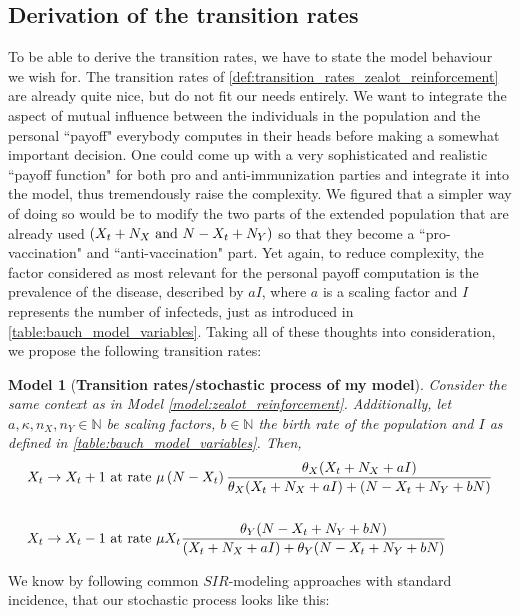 \documentclass[12pt,a4paper,twoside]{article}
\newtheorem{model}{Model}[section]
\begin{document}
\subsection{Derivation of the transition rates}
To be able to derive the transition rates, we have to state the model behaviour we wish for. The transition rates of \eqref{def:transition_rates_zealot_reinforcement} are already quite nice, but do not fit our needs entirely. We want to integrate the aspect of mutual influence between the individuals in the population and the personal ``payoff" everybody computes in their heads before making a somewhat important decision. One could come up with a very sophisticated and realistic ``payoff function" for both pro and anti-immunization parties and integrate it into the model, thus tremendously raise the complexity. We figured that a simpler way of doing so would be to modify the two parts of the extended population that are already used $\left(X_t + N_X\textnormal{ and }N- X_t + N_Y\right)$ so that they become a ``pro-vaccination" and ``anti-vaccination" part. Yet again, to reduce complexity, the factor considered as most relevant for the personal payoff computation is the prevalence of the disease, described by $aI$, where $a$ is a scaling factor and $I$ represents the number of infecteds, just as introduced in \eqref{table:bauch_model_variables}. %
Taking all of these thoughts into consideration, we propose the following transition rates:
\begin{model}[\textbf{Transition rates/stochastic process of my model}]
	Consider the same context as in Model \ref{model:zealot_reinforcement}. Additionally, let $a,\kappa, n_X, n_Y \in \mathbb{N}$ be scaling factors, $b \in \mathbb{N}$ the birth rate of the population and $I$ as defined in \eqref{table:bauch_model_variables}. Then,
\begin{align}\label{def:transition_rates_my_model}
\begin{split}
X_t \rightarrow X_t + 1 & \textnormal{ at rate } \mu\left(N-X_t\right)\frac{\theta_X (X_t + N_X + aI)}{\theta_X (X_t + N_X + aI) + (N-X_t + N_Y + bN)} \\
&\\
X_t \rightarrow X_t - 1 & \textnormal{ at rate } \mu X_t\frac{\theta_Y(N-X_t+N_Y + bN)}{(X_t + N_X+aI) + \theta_Y(N-X_t+N_Y + bN)}
\end{split}
\end{align}
\end{model}
	We know by following common $SIR$-modeling approaches with standard incidence, that our stochastic process looks like this:
\end{document}
